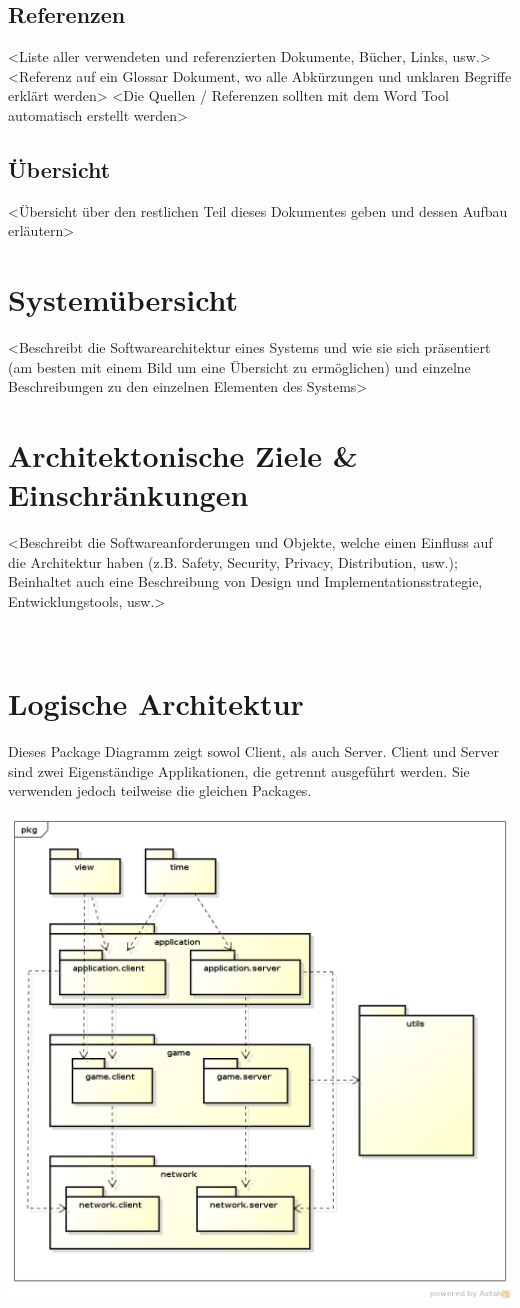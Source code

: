 \documentclass[11pt]{scrartcl}
\begin{document}
\subsection{Referenzen}
<Liste aller verwendeten und referenzierten Dokumente, Bücher, Links, usw.>
<Referenz auf ein Glossar Dokument, wo alle Abkürzungen und unklaren Begriffe erklärt werden>
<Die Quellen / Referenzen sollten mit dem Word Tool automatisch erstellt werden>
\subsection{Übersicht}
<Übersicht über den restlichen Teil dieses Dokumentes geben und dessen Aufbau erläutern>
 
\section{Systemübersicht}
<Beschreibt die Softwarearchitektur eines Systems und wie sie sich präsentiert (am besten mit einem Bild um eine Übersicht zu ermöglichen) und einzelne Beschreibungen zu den einzelnen Elementen des Systems>
 
\section{Architektonische Ziele \& Einschränkungen}
<Beschreibt die Softwareanforderungen und Objekte, welche einen Einfluss auf die Architektur haben (z.B. Safety, Security, Privacy, Distribution, usw.); Beinhaltet auch eine Beschreibung von Design und Implementationsstrategie, Entwicklungstools, usw.>

\newpage
 
\section{Logische Architektur}
Dieses Package Diagramm zeigt sowol Client, als auch Server. Client und Server sind zwei Eigenständige Applikationen, die getrennt ausgeführt werden. Sie verwenden jedoch teilweise die gleichen Packages.

\includegraphics[scale=0.5]{LogischeSicht}
\end{document}

